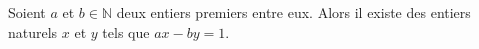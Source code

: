 Soient $a$ et $b \in \mathbb{N}$ deux entiers premiers entre eux. Alors il
existe des entiers naturels $x$ et $y$ tels que $ax - by = 1$.
